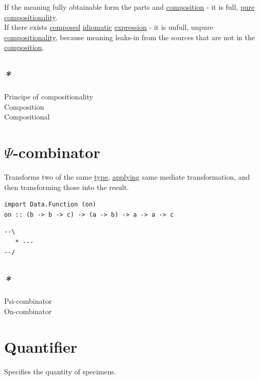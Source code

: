 \documentclass[a4paper,14pt,oneside]{book}
\begin{document}
If the meaning fully obtainable form the parts and \hyperref[orgb060001]{composition} - it is full, \hyperref[orgbb61cf1]{pure} \hyperref[orgee3aef3]{compositionality}.\\

If there exists \hyperref[org4c4e70a]{composed} \hyperref[org7d5cc88]{idiomatic} \hyperref[org6aa6989]{expression} - it is unfull, unpure \hyperref[orgee3aef3]{compositionality}, because meaning leaks-in from the sources that are not in the \hyperref[orgb060001]{composition}.\\

\section{\emph{*}}
\label{sec:orge510e94}

\label{orgb3346c8}Principe of compositionality\\
\label{orgf3c0c7c}Composition\\
\label{org3640c02}Compositional\\

\chapter{\label{orgfc05e20}\(\Psi\)-combinator}
\label{sec:org5a7c4ad}
Transforms two of the same \hyperref[orgd6db20c]{type}, \hyperref[org950e91e]{applying} same mediate transformation, and then transforming those into the result.\\
\begin{verbatim}
import Data.Function (on)
on :: (b -> b -> c) -> (a -> b) -> a -> a -> c
\end{verbatim}

\begin{verbatim}
--\
   * ---
--/
\end{verbatim}

\section{\emph{*}}
\label{sec:org0845ef6}

\label{org839decc}Psi-combinator\\
\label{orgedee7ca}On-combinator\\

\chapter{\label{org3c92bbc}Quantifier}
\label{sec:org22a55d8}
Specifies the quantity of specimens.\\
\end{document}
